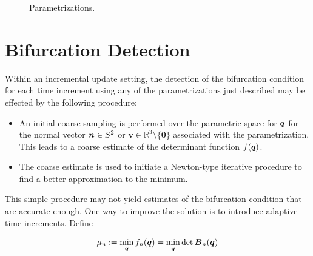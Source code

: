 \documentclass[12pt]{article}
\newcommand{\mbs}[1]{\boldsymbol{#1}}
\newcommand{\mbb}[1]{\mathbb{#1}}
\def\bv{{\mbs{v}}} \def\bw{{\mbs{w}}} \def\bx{{\mbs{x}}}
\numberwithin{equation}{section}
\begin{document}
\begin{figure}[htbp]
\begin{center}
{      \label{fig:tangent}
    }
    \caption{Parametrizations.}
    \label{fig:parametrizations}
  \end{center}
\end{figure}

\section{Bifurcation Detection}

Within an incremental update setting, the detection of the bifurcation
condition for each time increment using any of the parametrizations
just described may be effected by the following procedure:

\begin{itemize}
  
\item An initial coarse sampling is performed over the parametric
  space for $\bq$ for the normal vector $\bn \in S^2$ or $\bv \in
  \mbb{R}^3 \setminus \{\mathbf{0}\}$ associated with the
  parametrization. This leads to a coarse estimate of the determinant
  function $f(\bq)$.
  
\item The coarse estimate is used to initiate a Newton-type iterative
  procedure to find a better approximation to the minimum.


\end{itemize}

This simple procedure may not yield estimates of the bifurcation
condition that are accurate enough. One way to improve the solution is
to introduce adaptive time increments. Define

\begin{equation} \label{eq:general-minimization-problem}
  \mu_n := \min_{\bq} f_n(\bq) = \min_{\bq} \det \bB_n(\bq)
\end{equation}
\end{document}
